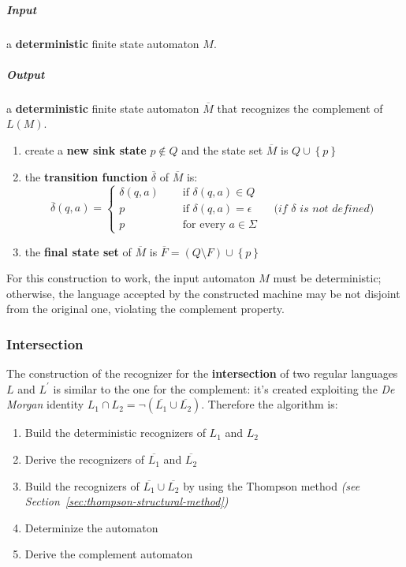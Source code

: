 \documentclass[english]{article}
\begin{document}
\subparagraph*{Input}
a \textbf{deterministic} finite state automaton \(M\).

\subparagraph*{Output}
a \textbf{deterministic} finite state automaton \(\overline{M}\) that recognizes the complement of \(L(M)\).

\begin{enumerate}
  \item create a \textbf{new sink state} \(p \notin Q\) and the state set \(\overline{M}\) is \(Q \cup \left\{ p \right\}\)
  \item the \textbf{transition function} \(\overline{\delta}\) of \(\overline{M}\) is:
        \[\overline{\delta}(q, a) = \begin{cases}
            \delta(q, a) \quad & \text{ if } \delta(q, a)\in Q                                                              \\
            p \quad            & \text{ if } \delta(q, a) = \epsilon \qquad \textit{(if }  \delta \textit{ is not defined)} \\
            p \quad            & \text{ for every } a \in \Sigma
          \end{cases}\]
  \item the \textbf{final state set} of \(\overline{M}\) is \(\overline{F} = \left( Q \setminus F \right) \cup \left\{ p \right\}\)
\end{enumerate}

For this construction to work, the input automaton \(M\) must be deterministic;
otherwise, the language accepted by the constructed machine may be not disjoint from the original one, violating the complement property.

\subsubsection{Intersection}

The construction of the recognizer for the \textbf{intersection} of two regular languages \(L\) and \(L^\prime\) is similar to the one for the complement:
it's created exploiting the \textit{De Morgan} identity \(L_1 \cap L_2 = \lnot (\overline{L_1} \cup \overline{L_2})\).
Therefore the algorithm is:

\begin{enumerate}
  \item Build the deterministic recognizers of \(L_1\) and \(L_2\)
  \item Derive the recognizers of \(\overline{L_1}\) and \(\overline{L_2}\)
  \item Build the recognizers of \(\overline{L_1} \cup \overline{L_2}\) by using the Thompson method \textit{(see Section~\ref{sec:thompson-structural-method})}
  \item Determinize the automaton
  \item Derive the complement automaton
\end{enumerate}
\end{document}
